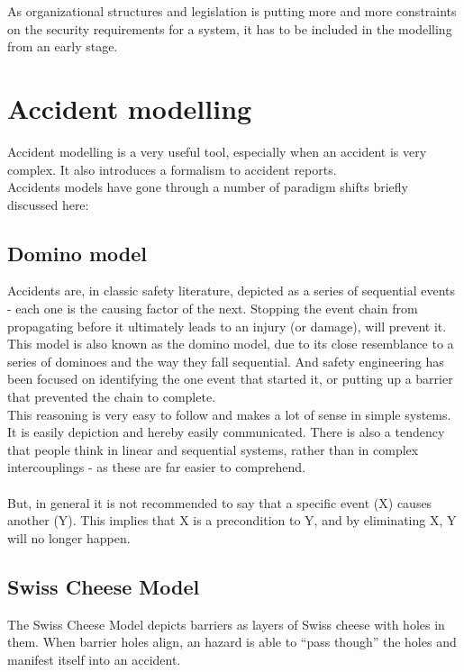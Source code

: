 \documentclass[10pt,oneside]{book}                  %
\begin{document}
As organizational structures and legislation is putting more and more constraints on the security requirements for a system, it has to be included in the modelling from an early stage.

\section{Accident modelling}
Accident modelling is a very useful tool, especially when an accident is very complex. It also introduces a formalism to accident reports.\\
Accidents models have gone through a number of paradigm shifts briefly discussed here:

\subsection{Domino model}
Accidents are, in classic safety literature, depicted as a series of sequential events - each one is the causing factor of the next. Stopping the event chain from propagating before it ultimately leads to an injury (or damage), will prevent it. This model is also known as the domino model, due to its close resemblance to a series of dominoes and the way they fall sequential. And safety engineering has been focused on identifying the one event that started it, or putting up a barrier that prevented the chain to complete.
\\
This reasoning is very easy to follow and makes a lot of sense in simple systems. It is easily depiction and hereby easily communicated. There is also a tendency that people think in linear and sequential systems, rather than in complex intercouplings - as these are far easier to comprehend.\\
\\
But, in general it is not recommended to say that a specific event (X) causes another (Y). This implies that X is a precondition to Y, and by eliminating X, Y will no longer happen\cite{sklet2002methods}.\\

\subsection{Swiss Cheese Model}
The Swiss Cheese Model depicts barriers as layers of Swiss cheese with holes in them. When barrier holes align, an hazard is able to ``pass though'' the holes and manifest itself into an accident.

\end{document}
